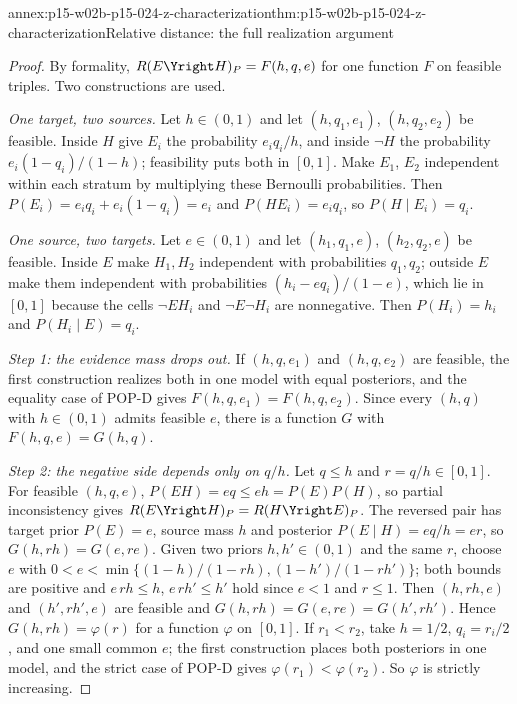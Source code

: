 \begin{annexitem}{annex:p15-w02b-p15-024-z-characterization}{thm:p15-w02b-p15-024-z-characterization}{Relative distance: the full realization argument}
\begin{proof}
By formality, \(R(E\Yright H)_P=F(h,q,e)\) for one function \(F\) on
feasible triples. Two constructions are used.

\emph{One target, two sources.} Let \(h\in(0,1)\) and let
\((h,q_1,e_1)\), \((h,q_2,e_2)\) be feasible. Inside \(H\) give \(E_i\)
the probability \(e_iq_i/h\), and inside \(\neg H\) the probability
\(e_i(1-q_i)/(1-h)\); feasibility puts both in \([0,1]\). Make \(E_1\),
\(E_2\) independent within each stratum by multiplying these Bernoulli
probabilities. Then \(P(E_i)=e_iq_i+e_i(1-q_i)=e_i\) and
\(P(HE_i)=e_iq_i\), so \(P(H\mid E_i)=q_i\).

\emph{One source, two targets.} Let \(e\in(0,1)\) and let
\((h_1,q_1,e)\), \((h_2,q_2,e)\) be feasible. Inside \(E\) make
\(H_1,H_2\) independent with probabilities \(q_1,q_2\); outside \(E\)
make them independent with probabilities \((h_i-eq_i)/(1-e)\), which lie
in \([0,1]\) because the cells \(\neg EH_i\) and \(\neg E\neg H_i\) are
nonnegative. Then \(P(H_i)=h_i\) and \(P(H_i\mid E)=q_i\).

\emph{Step 1: the evidence mass drops out.} If \((h,q,e_1)\) and
\((h,q,e_2)\) are feasible, the first construction realizes both in one
model with equal posteriors, and the equality case of POP-D gives
\(F(h,q,e_1)=F(h,q,e_2)\). Since every \((h,q)\) with \(h\in(0,1)\)
admits feasible \(e\), there is a function \(G\) with
\(F(h,q,e)=G(h,q)\).

\emph{Step 2: the negative side depends only on \(q/h\).} Let
\(q\leq h\) and \(r=q/h\in[0,1]\). For feasible \((h,q,e)\),
\(P(EH)=eq\leq eh=P(E)P(H)\), so partial inconsistency gives
\(R(E\Yright H)_P=R(H\Yright E)_P\). The reversed pair has target prior
\(P(E)=e\), source mass \(h\) and posterior \(P(E\mid H)=eq/h=er\), so
\(G(h,rh)=G(e,re)\). Given two priors \(h,h'\in(0,1)\) and the same
\(r\), choose \(e\) with
\(0<e<\min\{(1-h)/(1-rh),(1-h')/(1-rh')\}\); both bounds are positive
and \(e\,rh\leq h\), \(e\,rh'\leq h'\) hold since \(e<1\) and
\(r\leq1\). Then \((h,rh,e)\) and \((h',rh',e)\) are feasible and
\(G(h,rh)=G(e,re)=G(h',rh')\). Hence \(G(h,rh)=\varphi(r)\) for a
function \(\varphi\) on \([0,1]\). If \(r_1<r_2\), take \(h=1/2\),
\(q_i=r_i/2\), and one small common \(e\); the first construction
places both posteriors in one model, and the strict case of POP-D gives
\(\varphi(r_1)<\varphi(r_2)\). So \(\varphi\) is strictly increasing.


\end{proof}
\end{annexitem}
